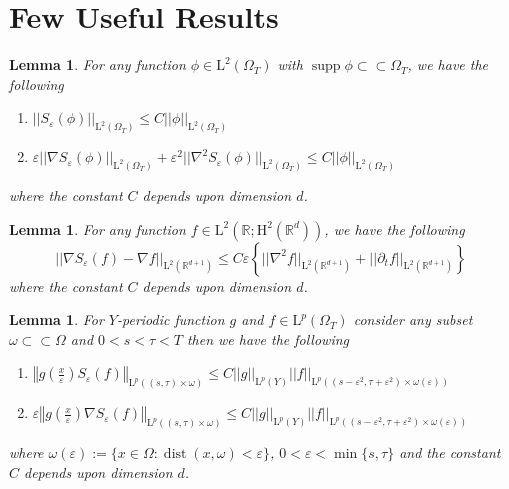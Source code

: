 \documentclass[preprint, 12pt]{amsart}
\numberwithin{equation}{section}
\newtheorem{lemma}[theorem]{Lemma}
\numberwithin{equation}{section}
\newcommand{\xeps}{\left(\frac{x}{\varepsilon}\right)}
\newcommand\RR{\mathbb{R}}
\newcommand{\eps}{\varepsilon}
\DeclareMathOperator{\dist}{dist}
\DeclareMathOperator{\supp}{supp}
\begin{document}

\appendix
\section{Few Useful Results}


\begin{lemma}\label{smooth: compact support}
For any function $\phi \in \mathrm{L}^{2}(\Omega_T)$ with $\supp{\phi} \subset \subset \Omega_T$, we have the following
\begin{enumerate}
\item $|| S_{\eps}(\phi)||_{\mathrm{L}^2(\Omega_T)} \leq C ||\phi||_{\mathrm{L}^2(\Omega_T)}$
\item $\eps || \nabla S_{\eps}(\phi)||_{\mathrm{L}^2(\Omega_T)} + \eps^2 || \nabla^2 S_{\eps}(\phi)||_{\mathrm{L}^2(\Omega_T)} \leq C ||\phi||_{\mathrm{L}^2(\Omega_T)}$
\end{enumerate}
where the constant $C$ depends upon dimension $d$.
\end{lemma}


\begin{lemma}\label{smooth: error}
For any function $f \in \mathrm{L}^{2}(\RR;\mathrm{H}^{2}(\RR^d))$, we have the following
\[
|| \nabla S_{\eps}(f) - \nabla f ||_{\mathrm{L}^2(\RR^{d+1})} \leq C \eps \left\{ || \nabla^2 f ||_{\mathrm{L}^2(\RR^{d+1})} + || \partial_t f ||_{\mathrm{L}^2(\RR^{d+1})} \right\}
\]
where the constant $C$ depends upon dimension $d$.
\end{lemma}


\begin{lemma}\label{smooth: extension}
For $Y$-periodic function $g$ and $f \in \mathrm{L}^{p}(\Omega_T)$ consider any subset $\omega \subset \subset \Omega$ and $0<s<\tau<T$ then we have the following
\begin{enumerate}
\item $\left\Vert g\xeps S_{\eps}(f) \right\Vert_{\mathrm{L}^p((s,\tau)\times \omega)} \leq C ||g||_{\mathrm{L}^p(Y)} || f ||_{\mathrm{L}^p((s-\eps^2, \tau + \eps^2)\times\omega(\eps))}$
\item $\eps\left\Vert g\xeps \nabla S_{\eps}(f) \right\Vert_{\mathrm{L}^p((s,\tau)\times \omega)} \leq C ||g||_{\mathrm{L}^p(Y)} || f ||_{\mathrm{L}^p((s-\eps^2, \tau + \eps^2)\times\omega(\eps))}$
\end{enumerate}
where $\omega(\eps):=\{x\in \Omega: \dist(x,\omega)<\eps\}$, $0<\eps <\min\{s,\tau\}$ and the constant $C$ depends upon dimension $d$.
\end{lemma}
\end{document}
